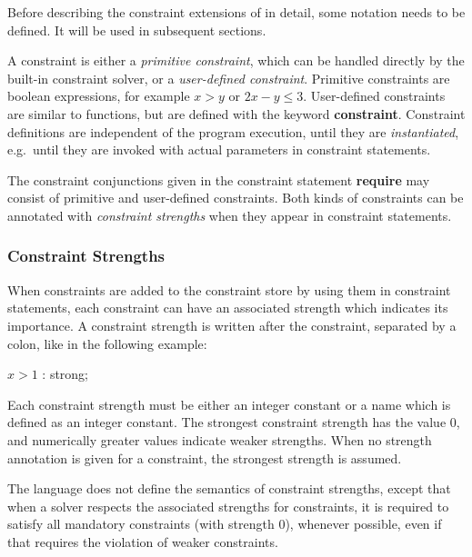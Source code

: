 Before describing the constraint extensions of \turtle{} in detail,
some notation needs to be defined.  It will be used in subsequent
sections.

%
A constraint is either a {\em primitive constraint}, which can be
handled directly by the built-in constraint solver, or a {\em
  user-defined constraint}.  Primitive constraints are boolean
expressions, for example $x > y$ or $2x-y\leq 3$.  User-defined
constraints are similar to functions, but are defined with the keyword
{\bf constraint}.  Constraint definitions are independent of the
program execution, until they are {\em instantiated}, e.g.~until they
are invoked with actual parameters in constraint statements.

The constraint conjunctions given in the constraint statement {\bf
  require} may consist of primitive and user-defined constraints.
Both kinds of constraints can be annotated with {\em constraint
  strengths} when they appear in constraint statements.

\subsubsection{Constraint Strengths}

%
When constraints are added to the constraint store by using them in
constraint statements, each constraint can have an associated strength
which indicates its importance.  A constraint strength is written
after the constraint, separated by a colon, like in the following
example:
%
\begin{ttlprog}
\>\ttlRequire{} $x > 1$ : strong;
\end{ttlprog}
%
Each constraint strength must be either an integer constant or a name
which is defined as an integer constant.  The strongest constraint
strength has the value 0, and numerically greater values indicate
weaker strengths.  When no strength annotation is given for a
constraint, the strongest strength is assumed.

The \turtle{} language does not define the semantics of constraint
strengths, except that when a solver respects the associated strengths
for constraints, it is required to satisfy all mandatory constraints
(with strength 0), whenever possible, even if that requires the
violation of weaker constraints.

